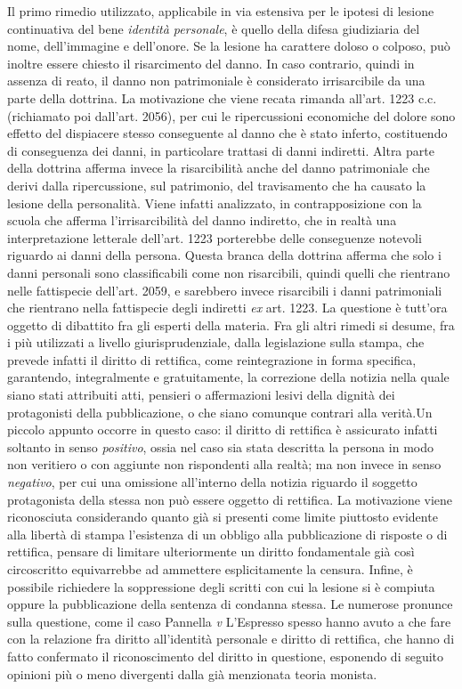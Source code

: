 Il primo rimedio utilizzato, applicabile in via estensiva per le ipotesi di lesione continuativa del bene \textit{identità personale}, è quello della difesa giudiziaria del nome, dell'immagine e dell'onore.
Se la lesione ha carattere doloso o colposo, può inoltre essere chiesto il risarcimento del danno. In caso contrario, quindi in assenza di reato, il danno non patrimoniale è considerato irrisarcibile da una parte della dottrina. La motivazione che viene recata rimanda all'art. 1223 c.c. (richiamato poi dall'art. 2056), per cui le ripercussioni economiche del dolore sono effetto del dispiacere stesso conseguente al danno che è stato inferto, costituendo di conseguenza dei danni, in particolare trattasi di danni indiretti. Altra parte della dottrina afferma invece la risarcibilità anche del danno patrimoniale che derivi dalla ripercussione, sul patrimonio, del travisamento che ha causato la lesione della personalità.
Viene infatti analizzato, in contrapposizione con la scuola che afferma l'irrisarcibilità del danno indiretto, che in realtà una interpretazione letterale dell'art. 1223 porterebbe delle conseguenze notevoli riguardo ai danni della persona. Questa branca della dottrina afferma che solo i danni personali sono classificabili come non risarcibili, quindi quelli che rientrano nelle fattispecie dell'art. 2059, e sarebbero invece risarcibili i danni patrimoniali che rientrano nella fattispecie degli indiretti \textit{ex} art. 1223. La questione è tutt'ora oggetto di dibattito fra gli esperti della materia.
Fra gli altri rimedi si desume, fra i più utilizzati a livello giurisprudenziale, dalla legislazione sulla stampa, che prevede infatti il diritto di rettifica, come reintegrazione in forma specifica, garantendo, integralmente e gratuitamente, la correzione della notizia nella quale siano stati attribuiti atti, pensieri o affermazioni lesivi della dignità dei protagonisti della pubblicazione, o che siano comunque contrari alla verità.Un piccolo appunto occorre in questo caso: il diritto di rettifica è assicurato infatti soltanto in senso \textit{positivo}, ossia nel caso sia stata descritta la persona in modo non veritiero o con aggiunte non rispondenti alla realtà; ma non invece in senso \textit{negativo}, per cui una omissione all'interno della notizia riguardo il soggetto protagonista della stessa non può essere oggetto di rettifica. La motivazione viene riconosciuta considerando quanto già si presenti come limite piuttosto evidente alla libertà di stampa l'esistenza di un obbligo alla pubblicazione di risposte o di rettifica, pensare di limitare ulteriormente un diritto fondamentale già così circoscritto equivarrebbe ad ammettere esplicitamente la censura.
Infine, è possibile richiedere la soppressione degli scritti con cui la lesione si è compiuta oppure la pubblicazione della sentenza di condanna stessa.
Le numerose pronunce sulla questione, come il caso Pannella \textit{v} L'Espresso 
spesso hanno avuto a che fare con la relazione fra diritto all'identità personale e diritto di rettifica, che hanno di fatto confermato il riconoscimento del diritto in questione, esponendo di seguito opinioni più o meno divergenti dalla già menzionata teoria monista.


